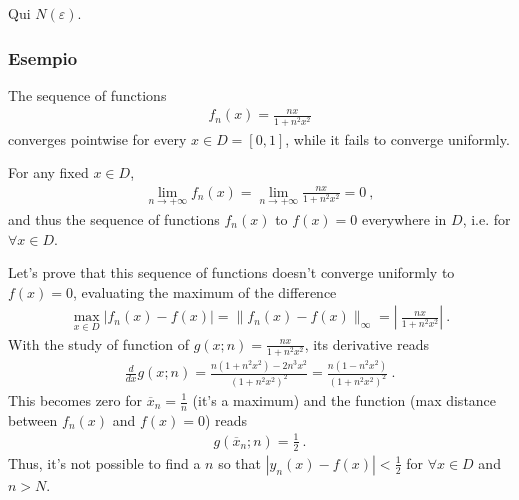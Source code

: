 \documentclass[letterpaper,10pt,italian]{jupyterBook}
\begin{document}
\sphinxAtStartPar
{} Qui \(N(\varepsilon)\).


\subsubsection{Esempio}
\label{\detokenize{ch/series/series-functions-real:esempio}}\label{\detokenize{ch/series/series-functions-real:math-hs-series-fun-sequences-convergence-example}}
\sphinxAtStartPar
The sequence of functions
\begin{equation*}
\begin{split}f_n(x) = \frac{n x}{1+n^2 x^2}\end{split}
\end{equation*}
\sphinxAtStartPar
converges pointwise for every \(x \in D = [0,1]\), while it fails to converge uniformly.

\sphinxAtStartPar
{} For any fixed \(x \in D\),
\begin{equation*}
\begin{split}\lim_{n \rightarrow +\infty} f_n(x) = \lim_{n \rightarrow +\infty} \frac{n x}{1+n^2 x^2} = 0 \ ,\end{split}
\end{equation*}
\sphinxAtStartPar
and thus the sequence of functions \(f_n(x)\)  to \(f(x) = 0\) everywhere in \(D\), i.e. for \(\forall x \in D\).

\sphinxAtStartPar
{} Let’s prove that this sequence of functions doesn’t converge uniformly to \(f(x) = 0\), evaluating the maximum of the difference
\begin{equation*}
\begin{split}\max_{x \in D} | f_n(x) - f(x) | = \| f_n(x) - f(x) \|_{\infty} = \left|\ \frac{nx}{1+n^2x^2} \right| \ .\end{split}
\end{equation*}
\sphinxAtStartPar
With the study of function of \(g(x;n) = \frac{nx}{1+n^2x^2}\), its derivative reads
\begin{equation*}
\begin{split}\frac{d}{dx} g(x;n) = \frac{n(1+n^2 x^2) - 2 n^3 x^2}{(1+n^2 x^2)^2} = \frac{n ( 1 - n^2 x^2 )}{(1+n^2 x^2)^2} \ .\end{split}
\end{equation*}
\sphinxAtStartPar
This becomes zero for \(\overline{x}_n = \frac{1}{n}\) (it’s a maximum) and the function (max distance between \(f_n(x)\) and \(f(x)=0\)) reads
\begin{equation*}
\begin{split}g(\overline{x}_n;n) = \frac{1}{2} \ .\end{split}
\end{equation*}
\sphinxAtStartPar
Thus, it’s not possible to find a \(n\) so that \(|y_{n}(x) - f(x)| < \frac{1}{2}\) for \(\forall x \in D\) and \(n > N\).
\end{document}
